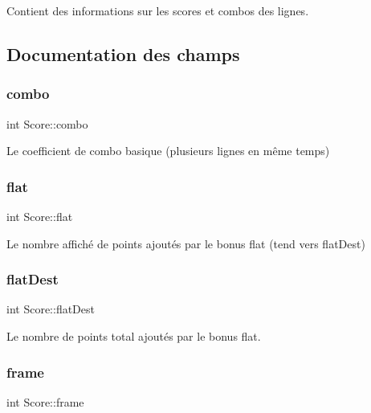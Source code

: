 Contient des informations sur les scores et combos des lignes. 

\subsection{Documentation des champs}
\mbox{\label{struct_score_ae22d389a99bf914464ec06fbda7ccf0d}} 
\subsubsection{\texorpdfstring{combo}{combo}}
{\footnotesize\ttfamily int Score\+::combo}



Le coefficient de combo basique (plusieurs lignes en même temps) 

\mbox{\label{struct_score_a66bc112fd9a6ba0826960e9d5bf3913b}} 
\subsubsection{\texorpdfstring{flat}{flat}}
{\footnotesize\ttfamily int Score\+::flat}



Le nombre affiché de points ajoutés par le bonus flat (tend vers flat\+Dest) 

\mbox{\label{struct_score_acf6a92022c51593eea83f33aced7f0a9}} 
\subsubsection{\texorpdfstring{flat\+Dest}{flatDest}}
{\footnotesize\ttfamily int Score\+::flat\+Dest}



Le nombre de points total ajoutés par le bonus flat. 

\mbox{\label{struct_score_a4203bd2c8f75b527367569fad5af22e8}} 
\subsubsection{\texorpdfstring{frame}{frame}}
{\footnotesize\ttfamily int Score\+::frame}



